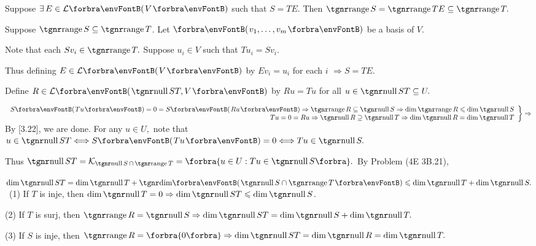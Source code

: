 \par\quad
Suppose $\exists\,E\in\Lm{V}$ such that $S = TE$. Then $\range S=\range TE\subseteq\range T.$\par\quad
Suppose $\range S\subseteq\range T$. Let $\Par{v_1,\dots,v_m}$ be a basis of $V.$\par\quad
Note that each $Sv_i\in\range T.$ Suppose $u_i\in V$ such that $Tu_i=Sv_i.$\par\quad
Thus defining $E\in\Lm{V}$ by $Ev_i=u_i$ for each $i$ $\Rightarrow S=TE.$\PfEnd
\SepLine

\par\quad
Define $R\in\Lm{\null ST,V}$ by $Ru=Tu$ for all $u\in\null ST\subseteq U.$\par\quad
$\MathRightBrace{r}{S\Par{Tu}=0=S\Par{Ru}\Rightarrow\range R\subseteq\null S\Rightarrow\dim\range R\leqslant\dim\null S\\ Tu=0=Ru\Rightarrow\null R\supseteq\null T\Rightarrow\dim\null R=\dim\null T}\Rightarrow$ By [3.22], we are done.\PfEnd[-23pt]\vspace{10pt}\quad
\Or For any $u\in U,$ note that $u\in\null ST\Longleftrightarrow S\Par{Tu}=0\Longleftrightarrow Tu\in\null S.$\par\quad
Thus $\null ST=\mathcal{K}_{\null S\,\cap\,\range T}=\Bra{u\in U:Tu\in\null S}.$ By Problem (4E 3B.21),\par\quad
$\dim\null ST=\dim\null T+\Dim\Par{\null S\cap\range T}\leqslant\dim\null T+\dim\null S.$\vspace{4pt}\PfEnd
\Corollary \,\,\,(1) If $T$ is inje, then $\dim\null T=0\Rightarrow\dim\null ST\leqslant\dim\null S$.\par\Blind{\Corollary \,\,}
(2) If $T$ is surj, then $\range R=\null S\Rightarrow\dim\null ST=\dim\null S+\dim\null T.$\par\Blind{\Corollary \,\,}
(3) If $S$ is inje, then $\range R=\zeroSubs\Rightarrow \dim\null ST=\dim\null R=\dim\null T.$
\SepLine

